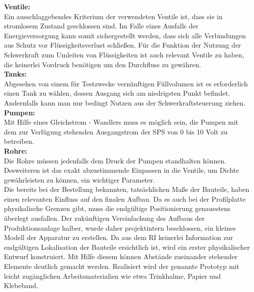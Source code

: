 	\textbf{Ventile:}\\
	Ein ausschlaggebendes Kriterium der verwendeten Ventile ist, dass sie in stromlosem Zustand geschlossen sind. Im Falle eines Ausfalls der Energieversorgung kann somit sichergestellt werden, dass sich alle Verbindungen aus Schutz vor Flüssigkeitsverlust schließen. Für die Funktion der Nutzung der Schwerkraft zum Umleiten von Flüssigkeiten ist auch relevant Ventile zu haben, die keinerlei Vordruck benötigen um den Durchfluss zu gewähren.\\

	\textbf{Tanks:}\\
	Abgesehen von einem für Testzwecke vernünftigen Füllvolumen ist es erforderlich einen Tank zu wählen, dessen Ausgang sich am niedrigsten Punkt befindet. Andernfalls kann man nur bedingt Nutzen aus der Schwerkraftsteuerung ziehen.\\
	
	\textbf{Pumpen:}\\
	Mit Hilfe eines Gleichstrom - Wandlers muss es möglich sein, die Pumpen mit dem zur Verfügung stehenden Ausgangstrom der \ac{SPS} von 0 bis 10 Volt zu betreiben.\\
	
	\textbf{Rohre:}\\
	Die Rohre müssen jedenfalls dem Druck der Pumpen standhalten können. Desweiteren ist das exakt abzustimmende Einpassen in die Ventile, um Dichte gewährleisten zu können, ein wichtiger Parameter.\\

	Die bereits bei der Bestellung bekannten, tatsächlichen Maße der Bauteile, haben einen relevanten Einfluss auf den finalen Aufbau. Da es auch bei der Profilplatte physikalische Grenzen gibt, muss die endgültige Positionierung genauestens überlegt ausfallen. Der zukünftigen Vereinfachung des Aufbaus der Produktionsanlage halber, wurde daher projektintern beschlossen, ein kleines Modell der Apparatur zu erstellen. Da aus dem \ac{RI} keinerlei Information zur endgültigen Lokalisation der Bauteile ersichtlich ist, wird ein erster physikalischer Entwurf konstruiert. Mit Hilfe diesem können Abstände zueinander stehender Elemente deutlich gemacht werden. Realisiert wird der genannte Prototyp mit leicht zugänglichen Arbeitsmaterialien wie etwa Trinkhalme, Papier und Klebeband.\\

